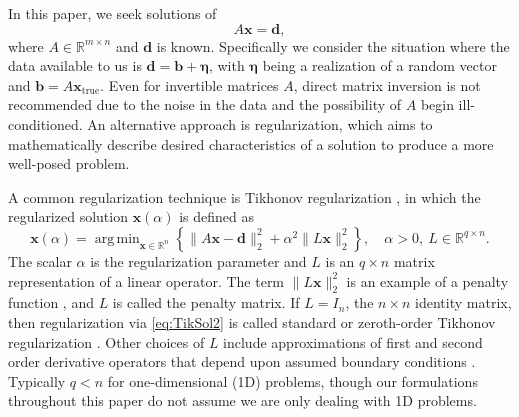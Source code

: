 \documentclass[12pt]{article}
\newcommand{\mA}{m}	%
\newcommand{\mL}{q}	%
\newcommand{\bVec}{\mathbf{b}}	%
\newcommand{\dVec}{\mathbf{d}}	%
\newcommand{\xVec}{\mathbf{x}}	%
\newcommand{\xTrue}{\mathbf{x}_{\text{true}}}	%
\newcommand{\regparam}{\alpha}  %
\newcommand{\xReg}{\xVec(\regparam)}	%
\DeclareMathOperator*{\argmin}{arg\,min}
\newcommand{\noise}{\eta}	%
\newcommand{\noiseVec}{\bm{\noise}}	%
\begin{document}
In this paper, we seek solutions of 
\begin{equation}
\label{eq:Ax = b}
A\xVec = \dVec,
\end{equation}
where $A \in \mathbb{R}^{\mA \times n}$ and $\dVec$ is known. Specifically we consider the situation where the data available to us is $\dVec = \bVec + \noiseVec$, with $\noiseVec$ being a realization of a random vector and $\bVec = A\xTrue$. Even for invertible matrices $A$, direct matrix inversion is not recommended due to the noise in the data and the possibility of $A$ begin ill-conditioned. An alternative approach is regularization, which aims to mathematically describe desired characteristics of a solution to produce a more well-posed problem. \par
A common regularization technique is Tikhonov regularization \cite{Tikh1963}, in which the regularized solution $\xReg$ is defined as
\begin{equation}
\label{eq:TikSol2}
\xVec(\regparam) = \argmin_{\xVec \in \mathbb{R}^n} \left\{\|A\xVec - \dVec\|_2^2 + \regparam^2\|L\xVec\|_2^2\right\}, \quad \regparam > 0, ~ L \in \mathbb{R}^{\mL \times n}.
\end{equation}
The scalar $\regparam$ is the regularization parameter and $L$ is an $\mL \times n$ matrix representation of a linear operator. The term $\|L\xVec\|_2^2$ is an example of a penalty function \cite{Vogel:2002}, and $L$ is called the penalty matrix. If $L = I_n$, the $n \times n$ identity matrix, then regularization via \eqref{eq:TikSol2} is called standard or zeroth-order Tikhonov regularization \cite{ABT}. Other choices of $L$ include approximations of first and second order derivative operators that depend upon assumed boundary conditions \cite{NeumannDCT,Strang1999,Vogel:2002}. Typically $q < n$ for one-dimensional (1D) problems, though our formulations throughout this paper do not assume we are only dealing with 1D problems. \par 
\end{document}
